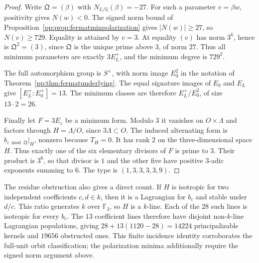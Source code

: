 \begin{proof}
Write $\mathfrak Q=(\beta)$ with $N_{L/\mathbb Q}(\beta)=-27$.
For such a parameter $v=\beta w$, positivity gives $N(w)<0$.
The signed norm bound of Proposition~\ref{pp:prop:fermatminpolarization}
gives $|N(w)|\ge27$, so $N(v)\ge729$. Equality is attained by $v=3$.
At equality $(v)$ has norm $3^6$, hence is $\mathfrak Q^2=(3)$,
since $\mathfrak Q$ is the unique prime above $3$, of norm $27$.
Thus all minimum parameters are exactly $3E_L^+$, and the minimum
degree is $729^2$.

The full automorphism group is $S^\times$, with norm image $E_0^2$
in the notation of Theorem~\ref{pp:thm:fermatunderlying}. The equal
signature images of $E_0$ and $E_L$ give $[E_L^+:E_0^+]=13$.
The minimum classes are therefore $E_L^+/E_0^2$, of size $13\cdot2=26$.

Finally let $F=3E_\varepsilon$ be a minimum form. Modulo $3$ it
vanishes on $O\times\Lambda$ and factors through $H=\Lambda/O$,
since $3\Lambda\subset O$. The induced alternating form is
$b_{\varepsilon\bmod\mathfrak Q}|_H$, nonzero because $T_H=0$.
It has rank $2$ on the three-dimensional space $H$. Thus exactly one
of the six elementary divisors of $F$ is prime to $3$. Their product
is $3^6$, so that divisor is $1$ and the other five have positive
$3$-adic exponents summing to $6$. The type is $(1,3,3,3,3,9)$.
\end{proof}

The residue obstruction also gives a direct count. If $H$ is isotropic
for two independent coefficients $c,d\in k$, then it is a Lagrangian
for $b_c$ and stable under $d/c$. This ratio generates $k$ over
$\mathbb F_3$, so $H$ is a $k$-line. Each of the $28$ such lines is
isotropic for every $b_c$. The $13$ coefficient lines therefore have
disjoint non-$k$-line Lagrangian populations, giving
$28+13(1120-28)=14224$ principalizable kernels and $19656$ obstructed
ones. This finite incidence identity corroborates the full-unit orbit
classification; the polarization minima additionally require the
signed norm argument above.

